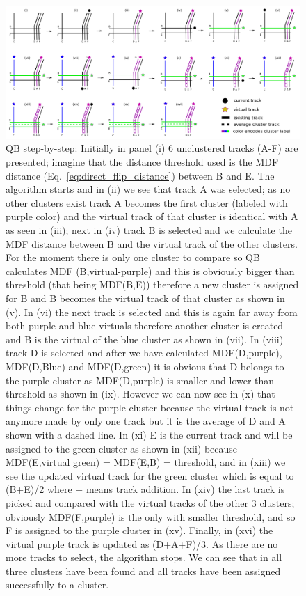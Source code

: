 \documentclass[preprint,authoryear,a4paper,10pt,onecolumn]{elsarticle}
\begin{document}
\begin{figure}
\includegraphics[scale=0.25]{last_figures/LSC_algorithm}
\caption{QB step-by-step: Initially in panel (i) 6 unclustered tracks
  (A-F) are presented; imagine that the distance threshold used is the
  MDF distance (Eq.~\ref{eq:direct_flip_distance}) between B and E. The
  algorithm starts and in (ii) we see that track A was selected; as no
  other clusters exist track A becomes the first cluster
  (labeled with purple color) and the virtual track of that cluster is
  identical with A as seen in (iii); next in (iv) track B is selected
  and we calculate the MDF distance between B and the virtual track of
  the other clusters. For the moment there is only one cluster to
  compare so QB calculates MDF (B,virtual-purple) and this is obviously
  bigger than threshold (that being MDF(B,E)) therefore a new cluster is
  assigned for B and B becomes the virtual track of that cluster as
  shown in (v). In (vi) the next track is selected and this is again far
  away from both purple and blue virtuals therefore another cluster is
  created and B is the virtual of the blue cluster as shown in (vii).
  In (viii) track D is selected and after we have calculated
  MDF(D,purple), MDF(D,Blue) and MDF(D,green) it is obvious that D
  belongs to the purple cluster as MDF(D,purple) is smaller and lower
  than threshold as shown in (ix). However we can now see in (x) that
  things change for the purple cluster because the virtual track is not
  anymore made by only one track but it is the average of D and A shown
  with a dashed line. In (xi) E is the current track and will be assigned to
  the green cluster as shown in (xii) because MDF(E,virtual green) =
  MDF(E,B) = threshold, and in (xiii) we see the updated virtual track
  for the green cluster which is equal to (B+E)/2 where + means track
  addition. In (xiv) the last track is picked and compared with the
  virtual tracks of the other 3 clusters; obviously MDF(F,purple) is the
  only with smaller threshold, and so F is assigned to the purple
  cluster in (xv). Finally, in (xvi) the virtual purple track is updated
  as (D+A+F)/3. As there are no more tracks to select, the algorithm
  stops. We can see that in all three clusters have been found and all tracks
  have been assigned successfully to a cluster.\label{Fig:LSC_simple}}
\end{figure}
\end{document}

